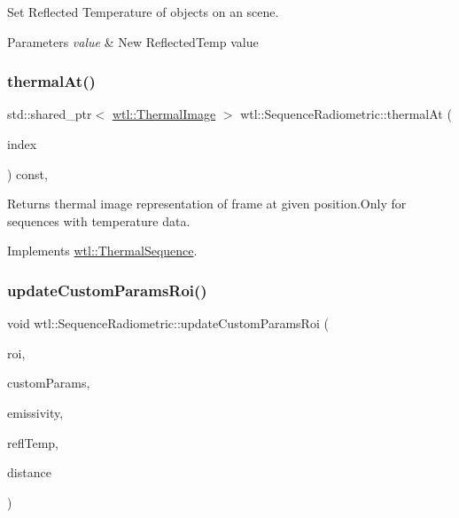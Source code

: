 Set Reflected Temperature of objects on an scene. 


\begin{DoxyParams}{Parameters}
{\em value} & New Reflected\+Temp value \\
\hline
\end{DoxyParams}
\mbox{\label{classwtl_1_1_sequence_radiometric_ae7b8f68b95bdda29cd202570c4fb9fbd}} 
\subsubsection{\texorpdfstring{thermal\+At()}{thermalAt()}}
{\footnotesize\ttfamily std\+::shared\+\_\+ptr$<$ \hyperlink{classwtl_1_1_thermal_image}{wtl\+::\+Thermal\+Image} $>$ wtl\+::\+Sequence\+Radiometric\+::thermal\+At (\begin{DoxyParamCaption}\item[{int}]{index }\end{DoxyParamCaption}) const\hspace{0.3cm}{\ttfamily [override]}, {\ttfamily [virtual]}}



Returns thermal image representation of frame at given position.\+Only for sequences with temperature data. 



Implements \hyperlink{classwtl_1_1_thermal_sequence_afa7db744c4112df11b20026eae1da399}{wtl\+::\+Thermal\+Sequence}.

\mbox{\label{classwtl_1_1_sequence_radiometric_ab42fcdd2531eb26af5f4801e1c8f171b}} 
\subsubsection{\texorpdfstring{update\+Custom\+Params\+Roi()}{updateCustomParamsRoi()}}
{\footnotesize\ttfamily void wtl\+::\+Sequence\+Radiometric\+::update\+Custom\+Params\+Roi (\begin{DoxyParamCaption}\item[{\hyperlink{structwtl_1_1_roi_struct}{Roi\+Struct} \&}]{roi,  }\item[{bool}]{custom\+Params,  }\item[{float}]{emissivity,  }\item[{float}]{refl\+Temp,  }\item[{float}]{distance }\end{DoxyParamCaption})}



